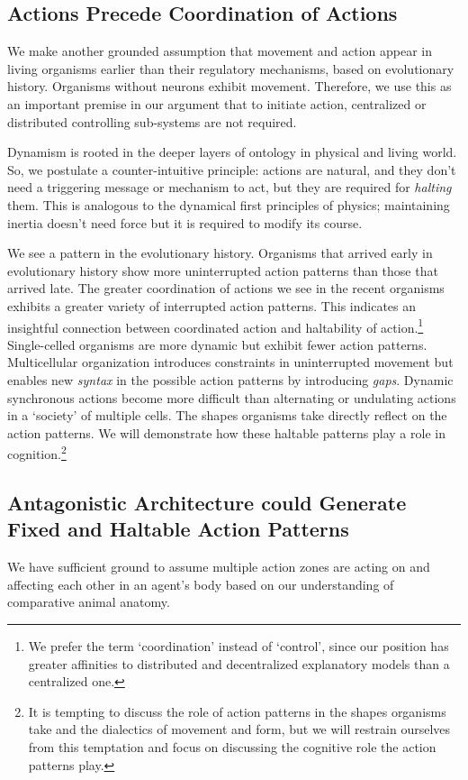 \subsection{Actions Precede Coordination of Actions}

We make another grounded assumption that movement and action appear in living organisms earlier than their regulatory mechanisms, based on evolutionary history.  Organisms without neurons exhibit movement. Therefore, we use this as an important premise in our argument that to initiate action, centralized or distributed controlling sub-systems are not required.  

Dynamism is rooted in the deeper layers of ontology in physical and living world.  So, we postulate a counter-intuitive principle: actions are natural, and they don't need a triggering message or mechanism to act, but they are required for \textit{halting} them. This is analogous to the dynamical first principles of physics; maintaining inertia doesn't need force but it is required to modify its course.  

We see a pattern in the evolutionary history.  Organisms that arrived early in evolutionary history show more uninterrupted action patterns than those that arrived late. The greater coordination of actions we see in the recent organisms exhibits a greater variety of interrupted action patterns. This indicates an insightful connection between coordinated action and haltability of action.\footnote{We prefer the term `coordination' instead of `control', since our position has greater affinities to distributed and decentralized explanatory models than a centralized one.} Single-celled organisms are more dynamic but exhibit fewer action patterns. Multicellular organization introduces constraints in uninterrupted movement but enables new \textit{syntax} in the possible action patterns by introducing \textit{gaps}.  Dynamic synchronous actions become more difficult than alternating or undulating actions in a `society' of multiple cells.  The shapes organisms take directly reflect on the action patterns. We will demonstrate how these haltable patterns play a role in cognition.\footnote{It is tempting to discuss the role of action patterns in the shapes organisms take and the dialectics of movement and form, but we will restrain ourselves from this temptation and focus on discussing the cognitive role the action patterns play.}   

\subsection{Antagonistic Architecture could Generate Fixed and Haltable Action Patterns}
We have sufficient ground to assume multiple action zones are acting on and affecting each other in an agent's body based on our understanding of comparative animal anatomy.


